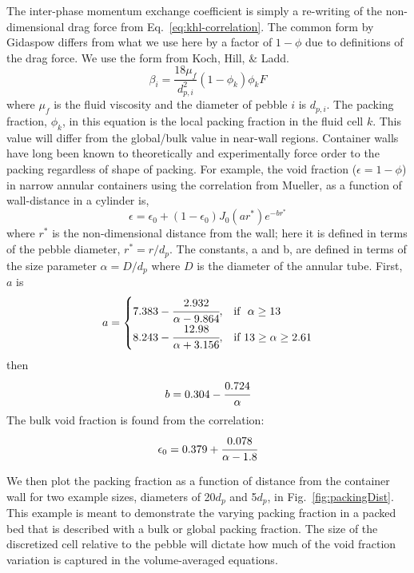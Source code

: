 The inter-phase momentum exchange coefficient is simply a re-writing of the non-dimensional drag force from Eq.~\ref{eq:khl-correlation}. The common form by Gidaspow\cite{gidaspow1994multiphase} differs from what we use here by a factor of $1-\phi$ due to definitions of the drag force. We use the form from Koch, Hill, \& Ladd.\cite{Hoef2005,Benyahia2006}
\begin{equation}\label{eq:interphase-momentum}
	\beta_{i} = \frac{18\mu_f}{d_{p,i}^2}(1-\phi_k)\phi_k F
\end{equation}
where $\mu_f$ is the fluid viscosity and the diameter of pebble $i$ is $d_{p,i}$. The packing fraction, $\phi_k$, in this equation is the local packing fraction in the fluid cell $k$. This value will differ from the global/bulk value in near-wall regions. Container walls have long been known to theoretically and experimentally force order to the packing regardless of shape of packing.\cite{Hunt1990,Benenati1962,Baird1958} For example, the void fraction ($\epsilon = 1-\phi$) in narrow annular containers using the correlation from Mueller, as a function of wall-distance in a cylinder is,\cite{Mueller1999}
\[
\epsilon = \epsilon_0 + (1-\epsilon_0)J_0(ar^*)e^{-br^*}
\]
where $r^*$ is the non-dimensional distance from the wall; here it is defined in terms of the pebble diameter, $r^* = r/d_p$. The constants, a and b, are defined in terms of the size parameter $\alpha = D/d_p$ where $D$ is the diameter of the annular tube. First, $a$ is
\[
    a= 
\begin{cases}
    7.383 - \cfrac{2.932}{\alpha - 9.864}, & \text{if }\  \alpha \geq 13\\
    8.243 - \cfrac{12.98}{\alpha + 3.156}, & \text{if} \ 13 \geq \alpha \geq 2.61
\end{cases}
\]
then
\[
b = 0.304 - \cfrac{0.724}{\alpha}
\]
The bulk void fraction is found from the correlation:
\[
\epsilon_0 = 0.379 + \cfrac{0.078}{\alpha - 1.8}
\]

We then plot the packing fraction as a function of distance from the container wall for two example sizes, diameters of 20$d_p$ and 5$d_p$, in Fig.~\ref{fig:packingDist}. This example is meant to demonstrate the varying packing fraction in a packed bed that is described with a bulk or global packing fraction. The size of the discretized cell relative to the pebble will dictate how much of the void fraction variation is captured in the volume-averaged equations.


